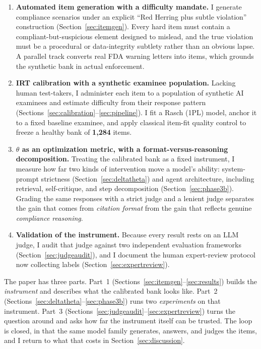 \begin{enumerate}[leftmargin=1.4em]
  \item \textbf{Automated item generation with a difficulty mandate.}
  I generate compliance scenarios under an explicit ``Red Herring plus
  subtle violation'' construction (Section~\ref{sec:itemgen}). Every hard
  item must contain a compliant-but-suspicious element designed to
  mislead, and the true violation must be a procedural or data-integrity
  subtlety rather than an obvious lapse. A parallel track converts real
  FDA warning letters into items, which grounds the synthetic bank in
  actual enforcement.

  \item \textbf{IRT calibration with a synthetic examinee population.}
  Lacking human test-takers, I administer each item to a population of
  synthetic AI examinees and estimate difficulty from their response
  pattern (Sections~\ref{sec:calibration}--\ref{sec:pipeline}). I fit a
  Rasch (1PL) model, anchor it to a fixed baseline examinee, and apply
  classical item-fit quality control to freeze a healthy bank of
  \textbf{1{,}284} items.

  \item \textbf{$\theta$ as an optimization metric, with a
  format-versus-reasoning decomposition.} Treating the calibrated bank as
  a fixed instrument, I measure how far two kinds of intervention move a
  model's ability: system-prompt strictness
  (Section~\ref{sec:deltatheta}) and agent architecture, including
  retrieval, self-critique, and step decomposition
  (Section~\ref{sec:phase3b}). Grading the same responses with a strict
  judge and a lenient judge separates the gain that comes from
  \emph{citation format} from the gain that reflects genuine
  \emph{compliance reasoning}.

  \item \textbf{Validation of the instrument.} Because every result rests
  on an LLM judge, I audit that judge against two independent evaluation
  frameworks (Section~\ref{sec:judgeaudit}), and I document the
  human expert-review protocol now collecting labels
  (Section~\ref{sec:expertreview}).
\end{enumerate}

The paper has three parts. Part~1
(Sections~\ref{sec:itemgen}--\ref{sec:results}) builds the
\emph{instrument} and describes what the calibrated bank looks like.
Part~2 (Sections~\ref{sec:deltatheta}--\ref{sec:phase3b}) runs two
\emph{experiments} on that instrument. Part~3
(Sections~\ref{sec:judgeaudit}--\ref{sec:expertreview}) turns the
question around and asks how far the instrument itself can be trusted.
The loop is closed, in that the same model family generates, answers, and
judges the items, and I return to what that costs in
Section~\ref{sec:discussion}.
